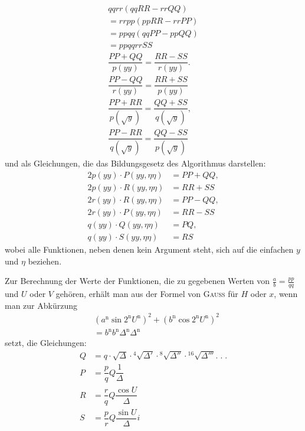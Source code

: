 \[
\begin{gathered}
qqrr(qqRR-rrQQ)\\[4pt]=rrpp(ppRR-rrPP)\\
=ppqq(qqPP-ppQQ)\\[4pt]=ppqqrrSS\\[4pt]
\dfrac{PP+QQ}{p(yy)}=\dfrac{RR-SS}{r(yy)}.\\[9pt]
\dfrac{PP-QQ}{r(yy)}=\dfrac{RR+SS}{p(yy)}\\[4pt]
\dfrac{PP+RR}{p(\surd  y)}=\dfrac{QQ+SS}{q(\surd  y)},\\[9pt]
\dfrac{PP-RR}{q(\surd  y)}=\dfrac{QQ-SS}{p(\surd  y)}
\end{gathered}
\]
und als Gleichungen, die das Bildungsgesetz des Algorithmus darstellen:
\[
\begin{aligned}
2p(yy)\cdot P(yy,\eta\eta)&=PP+QQ,\\[5pt]
2p(yy)\cdot R(yy,\eta\eta)&=RR+SS\\[5pt]
2r(yy)\cdot R(yy,\eta\eta)&=PP-QQ,\\[5pt]
2r(yy)\cdot P(yy,\eta\eta)&=RR-SS\\[5pt]
q(yy)\cdot Q(yy,\eta\eta)&=PQ,\\[5pt]
q(yy)\cdot S(yy,\eta\eta)&=RS
\end{aligned}
\]
wobei alle Funktionen, neben denen kein Argument steht, sich auf die einfachen $y$ und $\eta$ beziehen.


Zur Berechnung der Werte der Funktionen, die zu gegebenen Werten von $\frac ab=\frac{pp}{qq}$ und $U$ oder $V$ gehören, erhält man aus der Formel von \textsc{Gauss} für $H$ oder $x$, wenn man zur Abkürzung
\[
\begin{aligned}&(a^{\mathrm n}\sin 2^{\mathrm n} U^{\mathrm n})^2+(b^{\mathrm n}\cos 2^{\mathrm n} U^{\mathrm n})^2\\[5pt]&=b^{\mathrm n} b^{\mathrm n}\Delta^{\mathrm n}\Delta^{\mathrm n}\end{aligned}
\]
setzt, die Gleichungen:
\[
\begin{aligned}
Q&=q\cdot\surd \Delta\cdot{}^{4}\!\surd {\Delta'}\cdot{}^{8}\!\surd {\Delta''}\cdot{}^{16}\!\surd {\Delta'''}.\;.\;.\\[9pt]
P&=\dfrac pq Q\dfrac1\Delta\\[9pt]
R&=\dfrac rq Q\dfrac{\cos U}{\Delta}\\[9pt]
S&=\dfrac pr Q\dfrac{\sin U}{\Delta}i
\end{aligned}
\]

